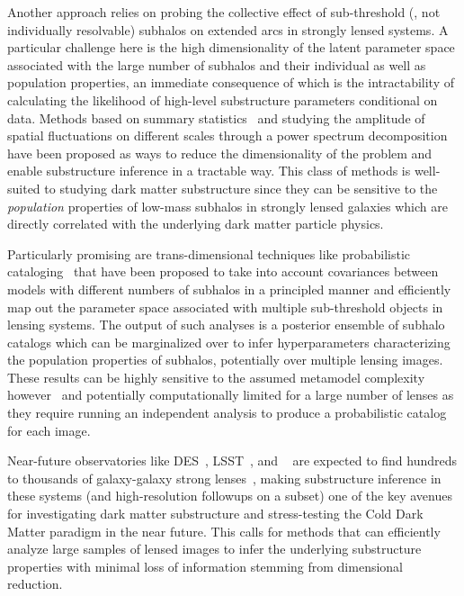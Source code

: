 \documentclass[twocolumn]{aastex62}
\begin{document}
Another approach relies on probing the collective effect of sub-threshold (\ie, not individually resolvable) subhalos on extended arcs in strongly lensed systems. A particular challenge here is the high dimensionality of the latent parameter space associated with the large number of subhalos and their individual as well as population properties, an immediate consequence of which is the intractability of calculating the likelihood of high-level substructure parameters conditional on data. Methods based on summary statistics~\citep{1702.00009} and studying the amplitude of spatial fluctuations on different scales through a power spectrum decomposition~\citep{1403.2720,1809.00004,1707.04590,1806.07897,1808.03501,1710.03075,1506.01724} have been proposed as ways to reduce the dimensionality of the problem and enable substructure inference in a tractable way. This class of methods is well-suited to studying dark matter substructure since they can be sensitive to the \emph{population} properties of low-mass subhalos in strongly lensed galaxies which are directly correlated with the underlying dark matter particle physics.

Particularly promising are trans-dimensional techniques like probabilistic cataloging~\citep{1508.00662,1706.06111} that have been proposed to take into account covariances between models with different numbers of subhalos in a principled manner and efficiently map out the parameter space associated with multiple sub-threshold objects in lensing systems. The output of such analyses is a posterior ensemble of subhalo catalogs which can be marginalized over to infer hyperparameters characterizing the population properties of subhalos, potentially over multiple lensing images. These results can be highly sensitive to the assumed metamodel complexity however~\citep{1706.06111} and potentially computationally limited for a large number of lenses as they require running an independent analysis to produce a probabilistic catalog for each image.

Near-future observatories like DES~\citep{1601.00329}, LSST~\citep{0912.0201,2019arXiv190201055D,1902.05141}, and \Euclid~\citep{1001.0061} are expected to find hundreds to thousands of galaxy-galaxy strong lenses~\citep{2015ApJ...811...20C,1001.2037,1003.5567}, making substructure inference in these systems (and high-resolution followups on a subset) one of the key avenues for investigating dark matter substructure and stress-testing the Cold Dark Matter paradigm in the near future. This calls for methods that can efficiently analyze large samples of lensed images to infer the underlying substructure properties with minimal loss of information stemming from dimensional reduction.
\end{document}
